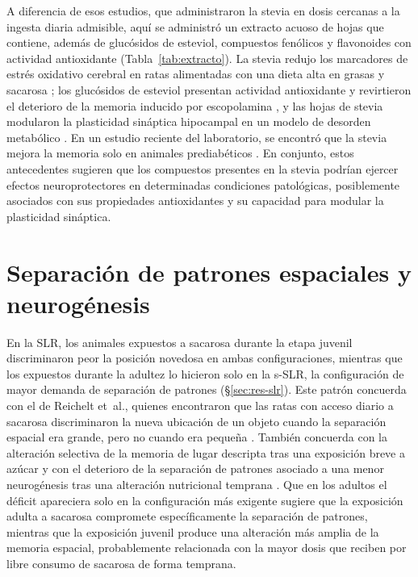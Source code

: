 A diferencia de esos estudios, que administraron la stevia en dosis cercanas a la ingesta diaria admisible, aquí se administró un extracto acuoso de hojas que contiene, además de glucósidos de esteviol, compuestos fenólicos y flavonoides con actividad antioxidante (Tabla~\ref{tab:extracto}). La stevia redujo los marcadores de estrés oxidativo cerebral en ratas alimentadas con una dieta alta en grasas y sacarosa \cite{pozdnyakova2025stevia}; los glucósidos de esteviol presentan actividad antioxidante \cite{prata2017glycosides} y revirtieron el deterioro de la memoria inducido por escopolamina \cite{singh2010stevioside}, y las hojas de stevia modularon la plasticidad sináptica hipocampal en un modelo de desorden metabólico \cite{chavushyan2017stevia}. En un estudio reciente del laboratorio, se encontró que la stevia mejora la memoria solo en animales prediabéticos \cite{marchena2025stevia}. En conjunto, estos antecedentes sugieren que los compuestos presentes en la stevia podrían ejercer efectos neuroprotectores en determinadas condiciones patológicas, posiblemente asociados con sus propiedades antioxidantes y su capacidad para modular la plasticidad sináptica.

\section{Separación de patrones espaciales y neurogénesis}\label{sec:disc-slr}\label{sec:disc-neurogenesis}

En la SLR, los animales expuestos a sacarosa durante la etapa juvenil discriminaron peor la posición novedosa en ambas configuraciones, mientras que los expuestos durante la adultez lo hicieron solo en la s-SLR, la configuración de mayor demanda de separación de patrones (\S\ref{sec:res-slr}). Este patrón concuerda con el de Reichelt et~al., quienes encontraron que las ratas con acceso diario a sacarosa discriminaron la nueva ubicación de un objeto cuando la separación espacial era grande, pero no cuando era pequeña \cite{reichelt2016sucrose}. También concuerda con la alteración selectiva de la memoria de lugar descripta tras una exposición breve a azúcar \cite{beilharz2014place,beilharz2016liquid} y con el deterioro de la separación de patrones asociado a una menor neurogénesis tras una alteración nutricional temprana \cite{perezgarcia2016malnutrition}. Que en los adultos el déficit apareciera solo en la configuración más exigente sugiere que la exposición adulta a sacarosa compromete específicamente la separación de patrones, mientras que la exposición juvenil produce una alteración más amplia de la memoria espacial, probablemente relacionada con la mayor dosis que reciben por libre consumo de sacarosa de forma temprana.


